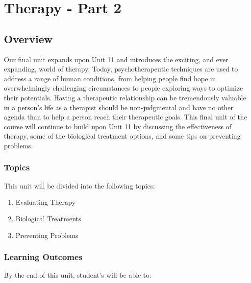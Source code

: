 \documentclass[
]{book}
\providecommand{\tightlist}{%
  \setlength{\itemsep}{0pt}\setlength{\parskip}{0pt}}
\begin{document}
\hypertarget{therapy---part-2}{%
\chapter{Therapy - Part 2}\label{therapy---part-2}}

\hypertarget{overview-11}{%
\section*{Overview}\label{overview-11}}

Our final unit expands upon Unit 11 and introduces the exciting, and ever expanding, world of therapy. Today, psychotherapeutic techniques are used to address a range of human conditions, from helping people find hope in overwhelmingly challenging circumstances to people exploring ways to optimize their potentials. Having a therapeutic relationship can be tremendously valuable in a person's life as a therapist should be non-judgmental and have no other agenda than to help a person reach their therapeutic goals. This final unit of the course will continue to build upon Unit 11 by discussing the effectiveness of therapy, some of the biological treatment options, and some tips on preventing problems.

\hypertarget{topics-11}{%
\subsection*{Topics}\label{topics-11}}

This unit will be divided into the following topics:

\begin{enumerate}
\def\labelenumi{\arabic{enumi}.}
\tightlist
\item
  Evaluating Therapy\\
\item
  Biological Treatments\\
\item
  Preventing Problems
\end{enumerate}

\hypertarget{learning-outcomes-11}{%
\subsection*{Learning Outcomes}\label{learning-outcomes-11}}

By the end of this unit, student's will be able to:
\end{document}
